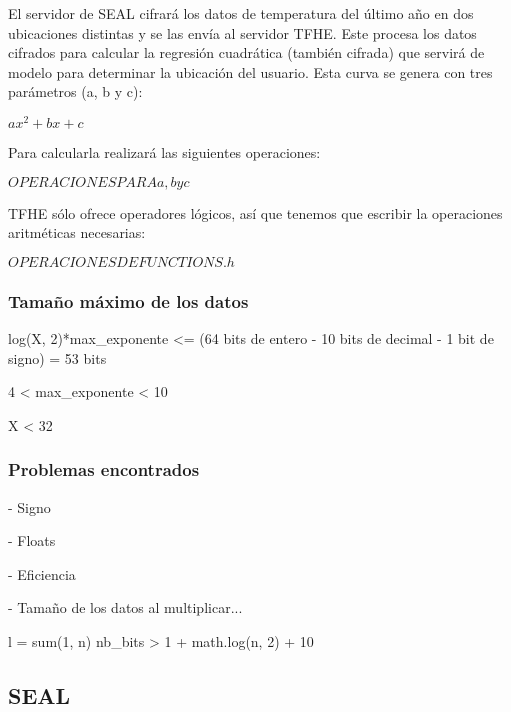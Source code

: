 El servidor de SEAL cifrará los datos de temperatura del último año en dos ubicaciones distintas y se las envía al servidor TFHE. Este procesa los datos cifrados para calcular la regresión cuadrática (también cifrada) que servirá de modelo para determinar la ubicación del usuario. Esta curva se genera con tres parámetros (a, b y c):

$ ax^2 + bx + c $

Para calcularla realizará las siguientes operaciones:

$ OPERACIONES PARA a, b y c $

TFHE sólo ofrece operadores lógicos, así que tenemos que escribir la operaciones aritméticas necesarias:

$ OPERACIONES DE FUNCTIONS.h $

\subsubsection{Tamaño máximo de los datos}

log(X, 2)*max_exponente <= (64 bits de entero - 10 bits de decimal - 1 bit de signo) = 53 bits

4 < max_exponente < 10

X < 32

\subsubsection{Problemas encontrados}

- Signo

- Floats

- Eficiencia


- Tamaño de los datos al multiplicar...

l = sum(1, n)
nb_bits > 1 + math.log(n, 2) + 10

\subsection{SEAL}
